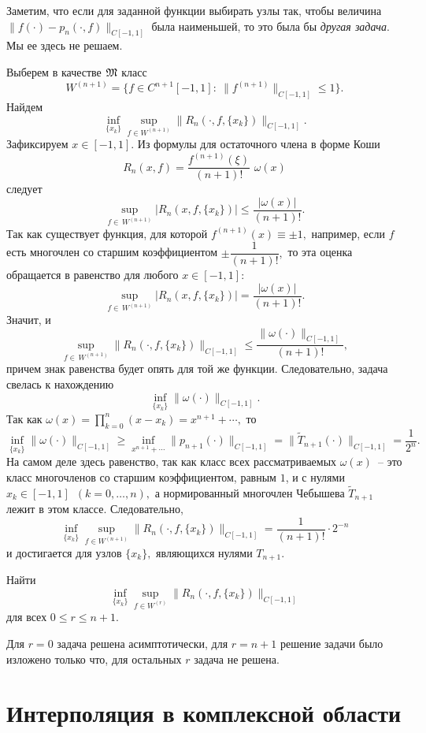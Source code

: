 Заметим, что если для заданной функции выбирать узлы так, чтобы величина
$\|f(\cdot )-p_n(\cdot ,f)\|_{C[-1,1]}$ была наименьшей, то это была бы
{\it другая задача}. Мы ее здесь не решаем.

Выберем в качестве $\mathfrak{M}$ класс
\[
 W^{(n+1)}=\{f{\in C^{n+1}[-1,1]}:\ \|f^{(n+1)}\|_{C[-1,1]}{\le 1}\}.
\]
Найдем
\[
  \inf_{\{x_k\}}\sup_{f \in W^{(n+1)}} \| R_{n}(\cdot ,f,\{x_k\}) \|_{C[-1,1]}.
\]
Зафиксируем $x \in [-1,1].$
Из формулы для остаточного члена в форме Коши
\[
   R_n(x,f)=\frac{f^{(n+1)}{(\xi )}}{(n+1)!} \,\,\omega (x)
\]
следует
\[
  \sup_{f \in \,W^{(n+1)}} | R_{n}(x ,f,\{x_k\}) | \le \frac{|\omega(x)|}{(n+1)!}.
\]
Так как существует функция, для которой $f^{(n+1)}(x) \equiv \pm 1,$ например,
если $f$ есть многочлен со старшим коэффициентом $\pm
\dfrac{1}{(n+1)!},$ то эта оценка обращается в равенство для любого $x \in [-1,1]$:
\[
  \sup_{f \in \,W^{(n+1)}} | R_{n}(x ,f,\{x_k\}) | =\frac{|\omega(x)|}{(n+1)!}.
\]
Значит, и
\[
  \sup_{f \in\, W^{(n+1)}} \| R_{n}(\cdot ,f,\{x_k\}) {\|}_{C[-1,1]} \le
                                \frac{\|\omega(\cdot )\|_{C[-1,1]}}{(n+1)!},
\]
причем {знак равенства будет} опять для той же функции.
Следовательно, задача свелась к нахождению
\[
  \inf_{\{x_k\}} \|\omega(\cdot )\|_{C[-1,1]}.
\]
Так как $\omega (x)=\prod\limits_{k=0}^n (x-x_k)=x^{n+1}+\cdots ,$ то
\[
  \inf_{\{x_k\}} \|\omega(\cdot )\|_{C[-1,1]} \ge
  \inf_{x^{n+1}+\cdots } \|p_{n+1}(\cdot )\|_{C[-1,1]}
  =\|\widetilde T_{n+1}(\cdot )\|_{C[-1,1]}=\frac{1}{2^{n}}.
\]
На самом деле здесь {равенство}, так как класс {всех рассматриваемых} $\omega (x)$~--
{это класс} многочленов со старшим коэффициентом,
равным $1$, и с нулями $x_k \in [-1,1]$\ $(k=0,\dots ,n),$ {а}
нормированный многочлен Чебышева {$\widetilde{T}_{n+1}$} лежит в этом
классе. Следовательно,
\[
  \inf_{\{x_k\}}\sup_{f \in W^{(n+1)}} \| R_{n}(\cdot ,f,\{x_k\}) \|_{C[-1,1]}
  =\frac{1}{(n+1)!}\cdot 2^{-n}
\]
и достигается для {узлов} $\{x_k\},$
являющихся нулями $T_{n+1}.$

\begin{task}
Найти
$$
\inf\limits_{\{x_k\}}\sup\limits_{f \in W^{(r)}}
             \| R_{n}(\cdot ,f,\{x_k\}) \|_{C[-1,1]}
$$
для всех $0 \le r \le n+1.$
\end{task}

Для $r=0$ задача {решена асимптотически,} для $r=n+1$ {решение задачи было} {изложено только
что,} для остальных $r$ задача не решена.

\section{Интерполяция в комплексной области}

